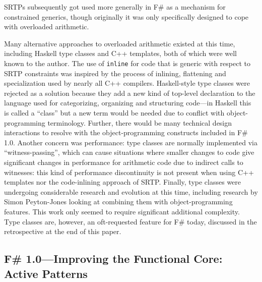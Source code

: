 \documentclass[acmsmall]{acmart}\settopmatter{}
\begin{document}
SRTPs subsequently got used more generally in F\# as a mechanism for constrained generics, though originally it was only specifically designed to cope with overloaded arithmetic.

Many alternative approaches to overloaded arithmetic existed at this time, including Haskell type classes \citep{Jones97typeclasses,HistoryOfHaskell} and
C++ templates, both of which were well known to the author. The use of \texttt{inline} for code that is generic with respect to SRTP
constraints was inspired by the process of inlining, flattening and specialization used by nearly all C++ compilers. Haskell-style type classes
were rejected as a solution because they add a new kind of top-level declaration to the language used for categorizing, organizing and
structuring code---in Haskell this is called a ``class'' but a new term would be needed due to conflict with object-programming terminology.
Further, there would be many technical design interactions to resolve with the object-programming constructs included in F\# 1.0. Another
concern was performance: type classes are normally implemented via ``witness-passing'', which can cause situations where smaller changes
to code give significant changes in performance for arithmetic code due to indirect calls to witnesses: this kind of performance discontinuity
is not present when using C++ templates nor the code-inlining approach of SRTP. Finally, type classes were undergoing considerable
research and evolution at this time, including research by Simon Peyton-Jones looking at combining them with object-programming features. This
work only seemed to require significant additional complexity. Type classes are, however, an oft-requested feature for F\# today, discussed in the retrospective at the end of this paper.



\subsection*{F\# 1.0---Improving the Functional Core: Active Patterns}
\end{document}
